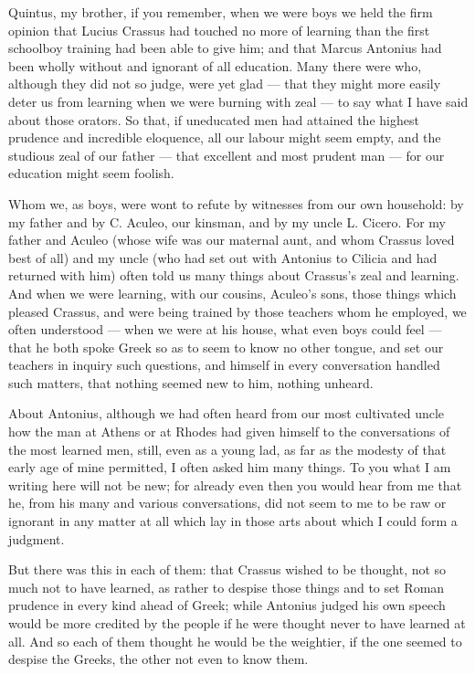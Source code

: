  Quintus, my brother, if you remember, when we were boys we held the firm opinion that Lucius Crassus had touched no more of learning than the first schoolboy training had been able to give him; and that Marcus Antonius had been wholly without and ignorant of all education. Many there were who, although they did not so judge, were yet glad — that they might more easily deter us from learning when we were burning with zeal — to say what I have said about those orators. So that, if uneducated men had attained the highest prudence and incredible eloquence, all our labour might seem empty, and the studious zeal of our father — that excellent and most prudent man — for our education might seem foolish.

 Whom we, as boys, were wont to refute by witnesses from our own household: by my father and by C. Aculeo, our kinsman, and by my uncle L. Cicero. For my father and Aculeo (whose wife was our maternal aunt, and whom Crassus loved best of all) and my uncle (who had set out with Antonius to Cilicia and had returned with him) often told us many things about Crassus's zeal and learning. And when we were learning, with our cousins, Aculeo's sons, those things which pleased Crassus, and were being trained by those teachers whom he employed, we often understood — when we were at his house, what even boys could feel — that he both spoke Greek so as to seem to know no other tongue, and set our teachers in inquiry such questions, and himself in every conversation handled such matters, that nothing seemed new to him, nothing unheard.

 About Antonius, although we had often heard from our most cultivated uncle how the man at Athens or at Rhodes had given himself to the conversations of the most learned men, still, even as a young lad, as far as the modesty of that early age of mine permitted, I often asked him many things. To you what I am writing here will not be new; for already even then you would hear from me that he, from his many and various conversations, did not seem to me to be raw or ignorant in any matter at all which lay in those arts about which I could form a judgment.

 But there was this in each of them: that Crassus wished to be thought, not so much not to have learned, as rather to despise those things and to set Roman prudence in every kind ahead of Greek; while Antonius judged his own speech would be more credited by the people if he were thought never to have learned at all. And so each of them thought he would be the weightier, if the one seemed to despise the Greeks, the other not even to know them.


